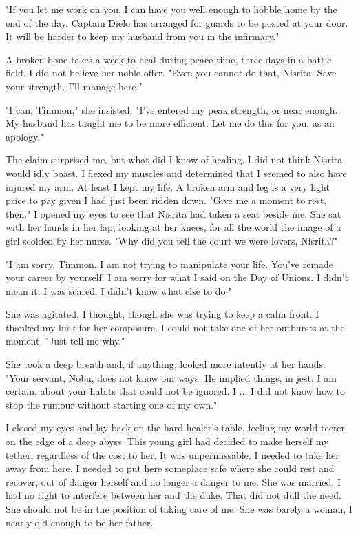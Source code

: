 \documentclass{article}
\begin{document}
"If you let me work on you, I can have you well enough to hobble home by the end of the day. Captain Dielo has arranged for guards to be posted at your door. It will be harder to keep my husband from you in the infirmary."

A broken bone takes a week to heal during peace time, three days in a battle field. I did not believe her noble offer. "Even you cannot do that, Nisrita. Save your strength. I'll manage here."

"I can, Timmon," she insisted. "I've entered my peak strength, or near enough. My husband has taught me to be more efficient. Let me do this for you, as an apology."

The claim surprised me, but what did I know of healing. I did not think Nisrita would idly boast. I flexed my muscles and determined that I seemed to also have injured my arm. At least I kept my life. A broken arm and leg is a very light price to pay given I had just been ridden down. "Give me a moment to rest, then." I opened my eyes to see that Nisrita had taken a seat beside me. She sat with her hands in her lap, looking at her knees, for all the world the image of a girl scolded by her nurse. "Why did you tell the court we were lovers, Nisrita?"

"I am sorry, Timmon. I am not trying to manipulate your life. You've remade your career by yourself. I am sorry for what I said on the Day of Unions. I didn't mean it. I was scared. I didn't know what else to do."

She was agitated, I thought, though she was trying to keep a calm front. I thanked my luck for her composure. I could not take one of her outbursts at the moment. "Just tell me why."

She took a deep breath and, if anything, looked more intently at her hands. "Your servant, Nobu, does not know our ways. He implied things, in jest, I am certain, about your habits that could not be ignored. I ... I did not know how to stop the rumour without starting one of my own."

I closed my eyes and lay back on the hard healer's table, feeling my world teeter on the edge of a deep abyss. This young girl had decided to make herself my tether, regardless of the cost to her. It was unpermissable. I needed to take her away from here. I needed to put here someplace safe where she could rest and recover, out of danger herself and no longer a danger to me. She was married, I had no right to interfere between her and the duke. That did not dull the need. She should not be in the position of taking care of me. She was barely a woman, I nearly old enough to be her father.
\end{document}
